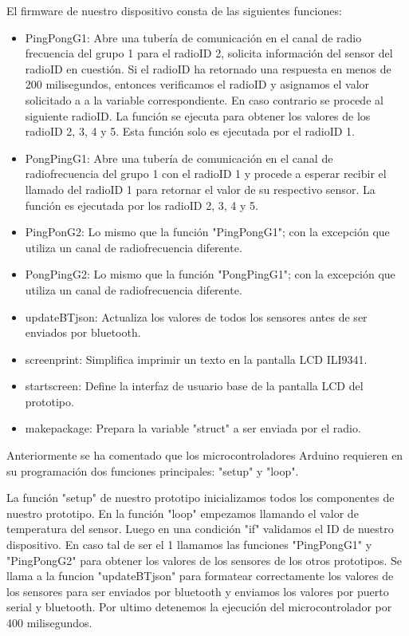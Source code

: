 \par \noindent
El firmware de nuestro dispositivo consta de las siguientes funciones:
\begin{itemize}
	\item PingPongG1: Abre una tubería de comunicación en el canal de radio frecuencia del grupo 1 para el radioID 2, solicita información del sensor del radioID en cuestión. Si el radioID ha retornado una respuesta en menos de 200 milisegundos, entonces verificamos el radioID y asignamos el valor solicitado a a la variable correspondiente. En caso contrario se procede al siguiente radioID. La función se ejecuta para obtener los valores de los radioID 2, 3, 4 y 5. Esta función solo es ejecutada por el radioID 1.
	
	\item PongPingG1: Abre una tubería de comunicación  en el canal de radiofrecuencia del grupo 1 con el radioID 1 y procede a esperar recibir el llamado del radioID 1 para retornar el valor de su respectivo sensor. La función es ejecutada por los radioID 2, 3, 4 y 5.
	
	\item PingPonG2: Lo mismo que la función "PingPongG1"; con la excepción que utiliza un canal de radiofrecuencia diferente.
	
	\item PongPingG2: Lo mismo que la función "PongPingG1"; con la excepción que utiliza un canal de radiofrecuencia diferente.
	
	\item updateBTjson: Actualiza los valores de todos los sensores antes de ser enviados por bluetooth.
	
	\item screenprint: Simplifica imprimir un texto en la pantalla LCD ILI9341.
	
	\item startscreen: Define la interfaz de usuario base de la pantalla LCD del prototipo.
	
	\item makepackage: Prepara la variable "struct" a ser enviada por el radio.
\end{itemize}

\par \noindent
Anteriormente se ha comentado que los microcontroladores Arduino requieren en su programación dos funciones principales: "setup" y "loop". 

\par \noindent
La función "setup" de nuestro prototipo inicializamos todos los componentes de nuestro prototipo. En la función "loop" empezamos llamando el valor de temperatura del sensor. Luego en una condición "if" validamos el ID de nuestro dispositivo. En caso tal de ser el 1 llamamos las funciones "PingPongG1" y "PingPongG2" para obtener los valores de los sensores de los otros prototipos. Se llama a la funcion "updateBTjson" para formatear correctamente los valores de los sensores para ser enviados por bluetooth y enviamos los valores por puerto serial y bluetooth. Por ultimo detenemos la ejecución del microcontrolador por 400 milisegundos.

